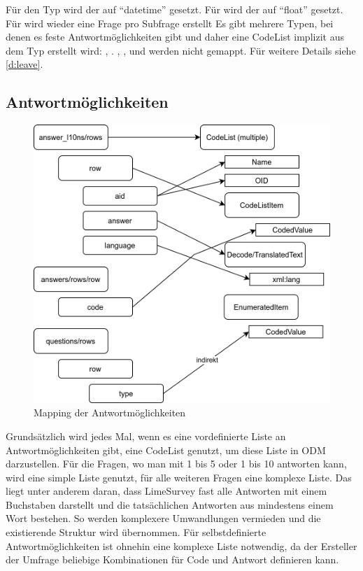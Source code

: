 Für den Typ  wird der  auf \enquote{datetime} gesetzt.
Für  wird der  auf \enquote{float} gesetzt. %
Für  wird wieder eine Frage pro Subfrage erstellt %
Es gibt mehrere Typen, bei denen es feste Antwortmöglichkeiten gibt und daher eine CodeList implizit aus dem Typ erstellt wird:
, .
, ,  und  werden nicht gemappt. Für weitere Details siehe \cref{d:leave}.

\subsection{Antwortmöglichkeiten}

\begin{figure}[h]
			\centering
			\includegraphics[width=.80\textwidth]{./img/m_answers.png}
			\caption{Mapping der Antwortmöglichkeiten}
\end{figure}

Grundsätzlich wird jedes Mal, wenn es eine vordefinierte Liste an Antwortmöglichkeiten gibt, eine CodeList genutzt, um diese Liste in ODM darzustellen.
Für die Fragen, wo man mit 1 bis 5 oder 1 bis 10 antworten kann, wird eine simple Liste genutzt, für alle weiteren Fragen eine komplexe Liste.
Das liegt unter anderem daran, dass LimeSurvey fast alle Antworten mit einem Buchstaben darstellt und die tatsächlichen Antworten aus mindestens einem Wort bestehen.
So werden komplexere Umwandlungen vermieden und die existierende Struktur wird übernommen.
Für selbstdefinierte Antwortmöglichkeiten ist ohnehin eine komplexe Liste notwendig, da der Ersteller der Umfrage beliebige Kombinationen für Code und Antwort definieren kann.

